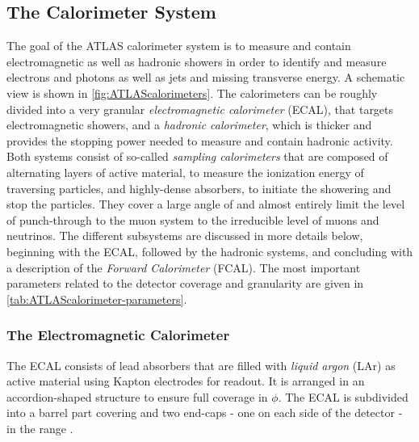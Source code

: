 \subsection{The Calorimeter System}
The goal of the ATLAS calorimeter system is to measure and contain electromagnetic as well as hadronic showers in order to identify and measure electrons and photons as well as jets and missing transverse energy. A schematic view is shown in \cref{fig:ATLAScalorimeters}.
The calorimeters can be roughly divided into a very granular \emph{electromagnetic calorimeter} (ECAL), that targets electromagnetic showers, and a \emph{hadronic calorimeter}, which is thicker and provides the stopping power needed to measure and contain hadronic activity. Both systems consist of so-called \emph{sampling calorimeters} that are composed of alternating layers of active material, to measure the ionization energy of traversing particles, and highly-dense absorbers, to initiate the showering and stop the particles. 
They cover a large angle of  and almost entirely limit the level of punch-through to the muon system to the irreducible level of muons and neutrinos. The different subsystems are discussed in more details below, beginning with the ECAL, followed by the hadronic systems, and concluding with a description of the \emph{Forward Calorimeter} (FCAL). The most important parameters related to the detector coverage and granularity are given in \cref{tab:ATLAScalorimeter-parameters}.


\subsubsection{The Electromagnetic Calorimeter}
The ECAL consists of lead absorbers that are filled with \emph{liquid argon} (LAr) as active material using Kapton electrodes for readout.
It is arranged in an accordion-shaped structure to ensure full coverage in $\phi$.
The ECAL is subdivided into a barrel part covering  and two end-caps - one on each side of the detector - in the range .

